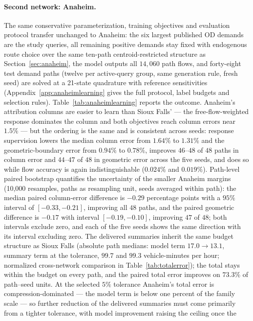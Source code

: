 \paragraph{Second network: Anaheim.}
The same conservative parameterization, training objectives and
evaluation protocol transfer unchanged to Anaheim: the six largest
published OD demands are the study queries, all remaining positive
demands stay fixed with endogenous route choice over the same ten-path
centroid-restricted structure as Section~\ref{sec:anaheim}, the model
outputs all $14{,}060$ path flows, and forty-eight test demand paths
(twelve per active-query group, same generation rule, fresh seed) are
solved at a 21-state quadrature with reference sensitivities
(Appendix~\ref{app:anaheimlearning} gives the full protocol, label
budgets and selection rules). Table~\ref{tab:anaheimlearning} reports the
outcome. Anaheim's attribution columns are easier to learn than Sioux
Falls' --- the free-flow-weighted response dominates the column and
both objectives reach column errors near $1.5\%$ --- but the ordering
is the same and is consistent across seeds: response supervision
lowers the median column error from $1.64\%$ to $1.31\%$ and the
geometric-boundary error from $0.94\%$ to $0.78\%$, improves $46$--$48$
of $48$ paths in column error and $44$--$47$ of $48$ in geometric
error across the five seeds, and does so while flow
accuracy is again indistinguishable ($0.024\%$ and $0.019\%$).
Path-level paired bootstrap quantifies the uncertainty of the smaller
Anaheim margins (10,000 resamples, paths as resampling unit, seeds
averaged within path): the median paired column-error difference is
$-0.29$ percentage points with a $95\%$ interval of $[-0.33,-0.21]$,
improving all $48$ paths, and the paired geometric difference is
$-0.17$ with interval $[-0.19,-0.10]$, improving $47$ of $48$; both
intervals exclude zero, and each of the five seeds shows the same
direction with its interval excluding zero. The
delivered summaries inherit the same budget structure as Sioux Falls
(absolute path medians: model term $17.0\to13.1$, summary term at the
tolerance, $99.7$ and $99.3$ vehicle-minutes per hour; normalized
cross-network comparison in Table~\ref{tab:totalerror}); the total
stays within the budget on every path, and the paired total error
improves on $73.3\%$ of path--seed units. At the selected $5\%$
tolerance Anaheim's total error is compression-dominated --- the model
term is below one percent of the family scale --- so further reduction
of the delivered summaries must come primarily from a tighter
tolerance, with model improvement raising the ceiling once the
